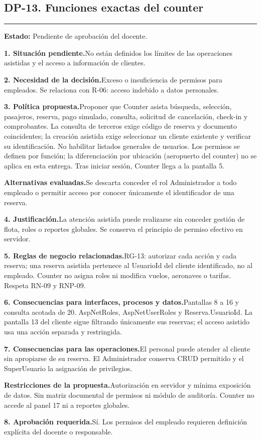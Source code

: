 \documentclass[11pt,a4paper]{article}
\newcommand{\fichacampo}[2]{\noindent\textbf{\color{azulvip}#1}\enspace #2\par\vspace{3pt}}
\begin{document}
\subsection{DP-13. Funciones exactas del counter}
{\color{doradovip}\rule{\textwidth}{.5pt}}
\textbf{Estado:} Pendiente de aprobación del docente.\par\vspace{4pt}
{\normalsize
\fichacampo{1. Situación pendiente.}{No están definidos los límites de las operaciones asistidas y el acceso a información de clientes.}
\fichacampo{2. Necesidad de la decisión.}{Exceso o insuficiencia de permisos para empleados. Se relaciona con R-06: acceso indebido a datos personales.}
\fichacampo{3. Política propuesta.}{Proponer que Counter asista búsqueda, selección, pasajeros, reserva, pago simulado, consulta, solicitud de cancelación, check-in y comprobantes. La consulta de terceros exige código de reserva y documento coincidentes; la creación asistida exige seleccionar un cliente existente y verificar su identificación. No habilitar listados generales de usuarios. Los permisos se definen por función; la diferenciación por ubicación (aeropuerto del counter) no se aplica en esta entrega. Tras iniciar sesión, Counter llega a la pantalla 5.}
\fichacampo{Alternativas evaluadas.}{Se descarta conceder el rol Administrador a todo empleado o permitir acceso por conocer únicamente el identificador de una reserva.}
\fichacampo{4. Justificación.}{La atención asistida puede realizarse sin conceder gestión de flota, roles o reportes globales. Se conserva el principio de permiso efectivo en servidor.}
\fichacampo{5. Reglas de negocio relacionadas.}{RG-13: autorizar cada acción y cada reserva; una reserva asistida pertenece al UsuarioId del cliente identificado, no al empleado. Counter no asigna roles ni modifica vuelos, aeronaves o tarifas. Respeta RN-09 y RNP-09.}
\fichacampo{6. Consecuencias para interfaces, procesos y datos.}{Pantallas 8 a 16 y consulta acotada de 20. AspNetRoles, AspNetUserRoles y Reserva.UsuarioId. La pantalla 13 del cliente sigue filtrando únicamente sus reservas; el acceso asistido usa una acción separada y restringida.}
\fichacampo{7. Consecuencias para las operaciones.}{El personal puede atender al cliente sin apropiarse de su reserva. El Administrador conserva CRUD permitido y el SuperUsuario la asignación de privilegios.}
\fichacampo{Restricciones de la propuesta.}{Autorización en servidor y mínima exposición de datos. Sin matriz documental de permisos ni módulo de auditoría. Counter no accede al panel 17 ni a reportes globales.}
\fichacampo{8. Aprobación requerida.}{Sí. Los permisos del empleado requieren definición explícita del docente o responsable.}
}
\clearpage
\end{document}
